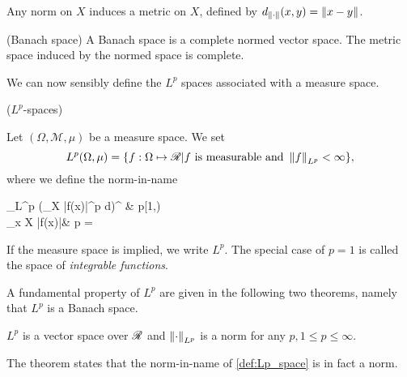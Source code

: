 \begin{definition}
\begin{definition}
\begin{remark}
	Any norm on $X$ induces a metric on $X$, defined by $d_{\left\lVert\cdot\right\rVert}(x,y) = \left\lVert x - y\right\rVert$. 
\end{remark}

\begin{definition}(Banach space)
	A Banach space is a complete normed vector space. The metric space induced by the normed space is complete. 
\end{definition}

We can now sensibly define the $L^p$ spaces associated with a measure space. 
\begin{definition}($L^p$-spaces) \label{def:Lp_space}
	
	Let $\left(\Omega, \mathcal{M}, \mu\right)$ be a measure space. We set 
	\begin{equation}
		L^p(\Omega, \mu) = \{ f : \Omega \mapsto \mathscr{R} | f \text{ is measurable and } \left\lVert f\right\rVert_{L^p} < \infty \},
	\end{equation}
	where we define the norm-in-name 
	\begin{numcases} {_{L^p}}
		 \left(\int_X \left|f(x)\right|^p d\mu\right)^{} & p\in [1,\infty) \label{Lp-norm1} \\
		 _{x \in X} \left|f(x)\right|& p = \infty \label{Lp-norm2}
	\end{numcases}
	If the measure space is implied, we write $L^p$. The special case of $p = 1$ is called the space of \emph{integrable functions}. 
\end{definition}

A fundamental property of $L^p$ are given in the following two theorems, namely that $L^p$ is a Banach space.  

\begin{theorem}
	$L^p$ is a vector space over $\mathscr{R}$ and $\left\lVert\cdot\right\rVert_{L^p}$ is a norm for any $p, 1 \leq p \leq \infty$. 
\end{theorem}

\begin{remark}
	The theorem states that the norm-in-name of \eqref{def:Lp_space} is in fact a norm.
\end{remark}


\end{definition}
\end{definition}
